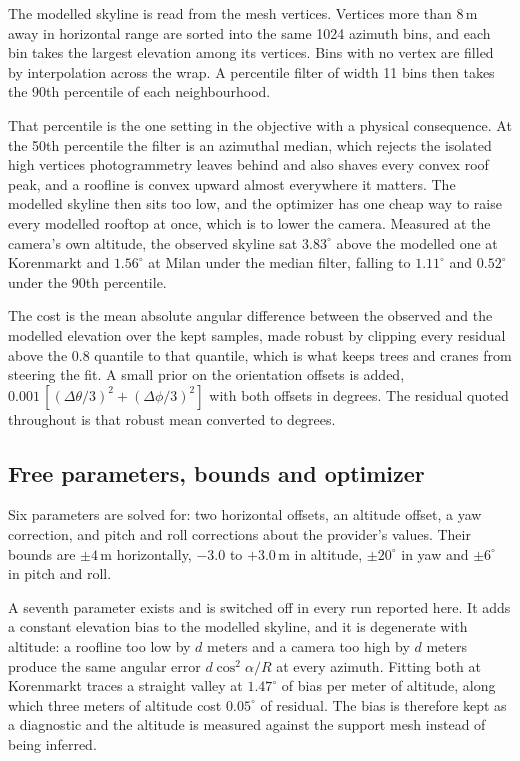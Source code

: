 \documentclass[journal]{IEEEtran}
\begin{document}
The modelled skyline is read from the mesh vertices. Vertices more than 8\,m
away in horizontal range are sorted into the same 1024 azimuth bins, and each
bin takes the largest elevation among its vertices. Bins with no vertex are
filled by interpolation across the wrap. A percentile filter of width 11 bins
then takes the 90th percentile of each neighbourhood.

That percentile is the one setting in the objective with a physical
consequence. At the 50th percentile the filter is an azimuthal median, which
rejects the isolated high vertices photogrammetry leaves behind and also shaves
every convex roof peak, and a roofline is convex upward almost everywhere it
matters. The modelled skyline then sits too low, and the optimizer has one cheap
way to raise every modelled rooftop at once, which is to lower the camera.
Measured at the camera's own altitude, the observed skyline sat $3.83^\circ$
above the modelled one at Korenmarkt and $1.56^\circ$ at Milan under the median
filter, falling to $1.11^\circ$ and $0.52^\circ$ under the 90th percentile.

The cost is the mean absolute angular difference between the observed and the
modelled elevation over the kept samples, made robust by clipping every residual
above the 0.8 quantile to that quantile, which is what keeps trees and cranes
from steering the fit. A small prior on the orientation offsets is added,
$0.001\,[(\Delta\theta/3)^2 + (\Delta\phi/3)^2]$ with both offsets in degrees.
The residual quoted throughout is that robust mean converted to degrees.

\subsection{Free parameters, bounds and optimizer}

Six parameters are solved for: two horizontal offsets, an altitude offset, a
yaw correction, and pitch and roll corrections about the provider's values.
Their bounds are $\pm4$\,m horizontally, $-3.0$ to $+3.0$\,m in altitude,
$\pm20^\circ$ in yaw and $\pm6^\circ$ in pitch and roll.

A seventh parameter exists and is switched off in every run reported here. It
adds a constant elevation bias to the modelled skyline, and it is degenerate
with altitude: a roofline too low by $d$ meters and a camera too high by $d$
meters produce the same angular error $d\cos^2\!\alpha / R$ at every azimuth.
Fitting both at Korenmarkt traces a straight valley at $1.47^\circ$ of bias per
meter of altitude, along which three meters of altitude cost $0.05^\circ$ of
residual. The bias is therefore kept as a diagnostic and the altitude is
measured against the support mesh instead of being inferred.
\end{document}
